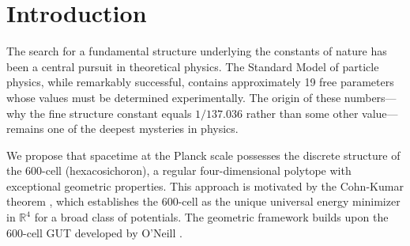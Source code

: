 \documentclass[12pt,a4paper]{article}
\begin{document}
\begin{abstract}
uniquely assigning each leg to $SU(3)_C$, $SU(2)_L$, or $U(1)_Y$ via the standard GUT breaking chain. The edge structure automatically forbids direct gauge--gauge couplings (A-A $=$ A-B $=$ B-B $= 0$), leaving exactly three interaction vertex types (ACC, BCC, CCC) in the ratio $1:2:2$; the massless graph propagator changes sign at distance $d=3$, exhibiting confinement-like behavior. A detailed analysis of the local neighborhood reveals a natural $1 + 3 + 8$ edge splitting that matches $\dim(U(1) \times SU(2) \times SU(3)) = 12$: each fermion has a geometrically unique ``special'' CC neighbor (degree~4, shared A-gauge vertex, zero shared B), and the effective gauge adjacency through fermion mediators reproduces the 24-cell exactly ($A_{\text{eff}} = A^2|_{\text{gauge}}/3$). Among 1200 plaquettes, only $SU(3)$ has pure plaquettes (288)---zero for $U(1)$ and $SU(2)$---reproducing the non-Abelian self-interaction structure of QCD. A vertex-transitivity theorem proves that spectral projections are sector-blind, establishing that the Lagrangian \emph{form} (from topology) and coupling \emph{values} (from the spectrum) are two independent geometric properties of the 600-cell. We explicitly identify remaining open problems including the three-generation count, the CKM derivation mechanism, and the need for a complete Lagrangian formulation.
\end{abstract}

\tableofcontents
\newpage

\section{Introduction}

The search for a fundamental structure underlying the constants of nature has been a central pursuit in theoretical physics. The Standard Model of particle physics, while remarkably successful, contains approximately 19 free parameters whose values must be determined experimentally. The origin of these numbers---why the fine structure constant equals $1/137.036$ rather than some other value---remains one of the deepest mysteries in physics.

We propose that spacetime at the Planck scale possesses the discrete structure of the 600-cell (hexacosichoron), a regular four-dimensional polytope with exceptional geometric properties. This approach is motivated by the Cohn-Kumar theorem \cite{cohn2007,cohn2011}, which establishes the 600-cell as the unique universal energy minimizer in $\mathbb{R}^4$ for a broad class of potentials. The geometric framework builds upon the 600-cell GUT developed by O'Neill \cite{oneill2025gut,oneill2023binary}.
\end{document}

